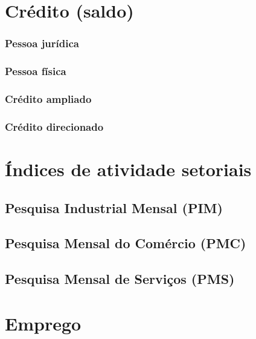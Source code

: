 \documentclass{SelfArx}
\begin{document}
\section*{Crédito (saldo)}
\label{sec:org996d64e}



\subsubsection*{Pessoa jurídica}
\label{sec:orgecf8e5f}

\subsubsection*{Pessoa física}
\label{sec:org2531c28}

\subsubsection*{Crédito ampliado}
\label{sec:orgf5af870}

\subsubsection*{Crédito direcionado}
\label{sec:orge02b7d1}



\section*{Índices de atividade setoriais}
\label{sec:org87b8224}



\subsection*{Pesquisa Industrial Mensal (PIM)}
\label{sec:orgb376805}


\subsection*{Pesquisa Mensal do Comércio (PMC)}
\label{sec:org6e3a66b}


\subsection*{Pesquisa Mensal de Serviços (PMS)}
\label{sec:orgec5421b}

\section*{Emprego}
\label{sec:org001331c}
\end{document}
